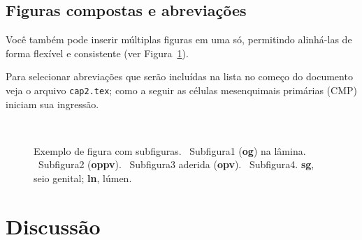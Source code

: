 \subsection{Figuras compostas e abreviações}\label{cap2:res:figs2}

Você também pode inserir múltiplas figuras em uma só, permitindo alinhá-las de forma flexível e consistente (ver Figura~\ref{fig:fsm}).

Para selecionar abreviações que serão incluídas na lista no começo do documento veja o arquivo \texttt{cap2.tex}; como a seguir as células mesenquimais primárias (CMP) iniciam sua ingressão.%

\begin{figure}[htbp]
    \centering
    \vspace{11pt}
    \\
    \vspace{-18pt}
    \vspace{11pt}
    \caption[Figura com subfiguras]{Exemplo de figura com subfiguras. ~Subfigura1 (\textbf{og}) na lâmina. ~Subfigura2 (\textbf{oppv}). ~Subfigura3 aderida (\textbf{opv}). ~Subfigura4. \textbf{sg}, seio genital; \textbf{ln}, lúmen.}%
    \label{fig:fsm}
\end{figure}

\section{Discussão}\label{cap2:disc}

